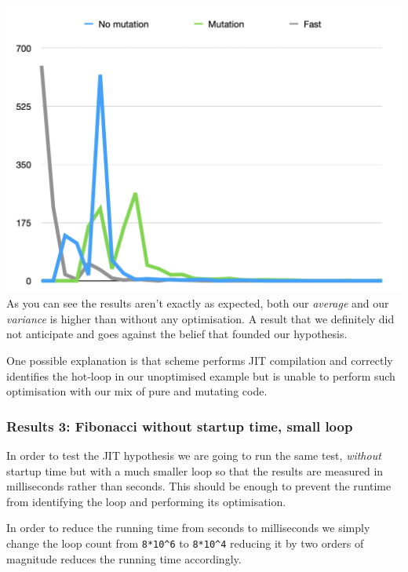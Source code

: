 \documentclass[
]{article}
\begin{document}
\includegraphics{Screenshot 2020-08-25 at 17.59.34.png} As you can see
the results aren't exactly as expected, both our \emph{average} and our
\emph{variance} is higher than without any optimisation. A result that
we definitely did not anticipate and goes against the belief that
founded our hypothesis.

One possible explanation is that scheme performs JIT compilation and
correctly identifies the hot-loop in our unoptimised example but is
unable to perform such optimisation with our mix of pure and mutating
code.

\hypertarget{results-3-fibonacci-without-startup-time-small-loop}{%
\subsubsection{Results 3: Fibonacci without startup time, small
loop}\label{results-3-fibonacci-without-startup-time-small-loop}}

In order to test the JIT hypothesis we are going to run the same test,
\emph{without} startup time but with a much smaller loop so that the
results are measured in milliseconds rather than seconds. This should be
enough to prevent the runtime from identifying the loop and performing
its optimisation.

In order to reduce the running time from seconds to milliseconds we
simply change the loop count from \texttt{8*10\^{}6} to
\texttt{8*10\^{}4} reducing it by two orders of magnitude reduces the
running time accordingly.
\end{document}
